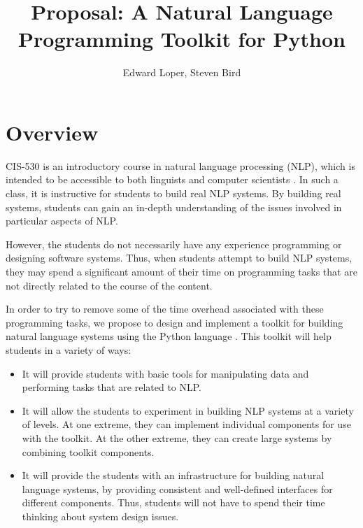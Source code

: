 \documentclass{article}
\begin{document}
\title{Proposal: A Natural Language Programming Toolkit for Python}
\author{Edward Loper, Steven Bird}
\maketitle

\section{Overview}

CIS-530 is an introductory course in natural language processing
(NLP), which is intended to be accessible to both linguists and
computer scientists \cite{cis530}. In such a class, it is instructive
for students to build real NLP systems.  By building real systems,
students can gain an in-depth understanding of the issues involved in
particular aspects of NLP.

However, the students do not necessarily have any experience
programming or designing software systems.  Thus, when students
attempt to build NLP systems, they may spend a significant amount of
their time on programming tasks that are not directly related to the
course of the content.

In order to try to remove some of the time overhead associated with
these programming tasks, we propose to design and implement a toolkit
for building natural language systems using the Python
language \cite{python}. This toolkit will help students in a variety
of ways:

\begin{itemize}
  \item It will provide students with basic tools for manipulating
  data and performing tasks that are related to NLP.

  \item It will allow the students to experiment in building NLP
  systems at a variety of levels.  At one extreme, they can implement
  individual components for use with the toolkit.  At the other
  extreme, they can create large systems by combining toolkit
  components.

  \item It will provide the students with an infrastructure for
  building natural language systems, by providing consistent and
  well-defined interfaces for different components.  Thus, students
  will not have to spend their time thinking about system design
  issues.
\end{itemize}
\end{document}
